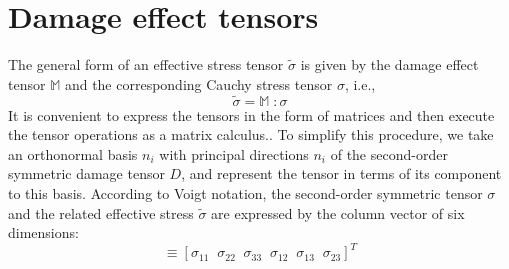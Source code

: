 \documentclass[12pt]{report}
\begin{document}
\section{Damage effect tensors}\label{Matrix Representation of Damage effect tensors}
\indent\indent\indent The general form of an effective stress tensor $\tilde{\sigma}$ is given by the damage effect tensor $\mathbb{M}$ and the corresponding Cauchy stress tensor $\sigma$, i.e.,
\begin{equation}
\tilde{\sigma}  = \mathbb{M} \; :  \sigma 
\label{eqn:effective_stress_tensor} 
\end{equation}
It is convenient to express the tensors in the form of matrices and then execute the tensor operations as a matrix calculus.. To simplify this procedure, we take an orthonormal basis ${n_{i}}$ with principal directions $n_{i}$ of the second-order symmetric damage tensor $D$, and represent the tensor in terms of its component to this basis. According to Voigt notation, the second-order symmetric tensor $\sigma$ and the related effective stress $\tilde{\sigma}$ are expressed by the column vector of six dimensions:
\begin{equation}
   [\sigma_{P}]  \equiv  [\sigma_{11} \;\; \sigma_{22} \;\;\sigma_{33} \;\;\sigma_{12} \;\;\sigma_{13} \;\;\sigma_{23} ]^{T}
\end{equation}
\end{document}
